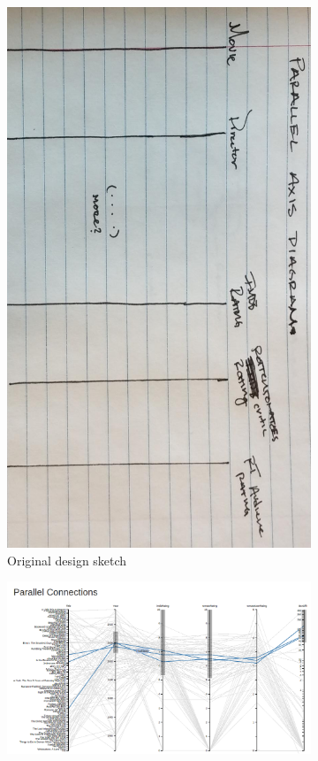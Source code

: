 \documentclass[12pt]{article}
\begin{document}
	\begin{figure}[h!]
		\centering
		\begin{subfigure}[t]{.5\textwidth}
			  \centering
			  \includegraphics[width=\linewidth]{images/parallel_crop.jpg}
			  \caption{Original design sketch}
			  \label{fig:sub1}
		\end{subfigure}%
		\begin{subfigure}[t]{.8\textwidth}
			  \centering
			  \includegraphics[width=.7\linewidth]{images/parallelAxisCoordVis.png}

\end{subfigure}
\end{figure}
\end{document}
